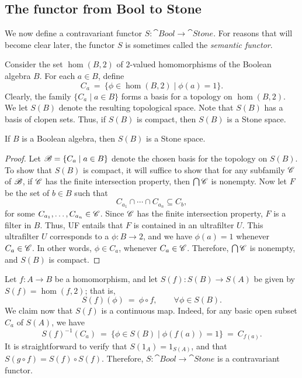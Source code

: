 \subsection*{The functor from Bool to Stone}

We now define a contravariant functor $S:\cat{Bool}\to\cat{Stone}$.
For reasons that will become clear later, the functor $S$ is sometimes
called the \emph{semantic functor}.

Consider the set $\hom (B,2)$ of $2$-valued homomorphisms of the
Boolean algebra $B$.  For each $a\in B$, define
\[ C_a \: = \: \{ \phi \in \hom (B,2) \mid \phi (a)=1 \} .\] Clearly,
the family $\{ C_a\mid a\in B\}$ forms a basis for a topology on $\hom
(B,2)$.  We let $S(B)$ denote the resulting topological space.  Note
that $S(B)$ has a basis of clopen sets.  Thus, if $S(B)$ is compact,
then $S(B)$ is a Stone space.

\begin{lemma} If $B$ is a Boolean algebra, then $S(B)$ is a Stone
  space. \end{lemma}

\begin{proof} Let $\mathscr B = \{ C_a\mid a\in B\}$ denote the chosen basis
  for the topology on $S(B)$.  To show that $S(B)$ is compact, it will
  suffice to show that for any subfamily $\mathscr C$ of $\mathscr B$, if $\mathscr C$ has
  the finite intersection property, then $\bigcap \mathscr C$ is nonempty.
  Now let $F$ be the set of $b\in B$ such that
  \[ C_{a_1}\cap \cdots \cap C_{a_n}\subseteq C_b ,\] for some
  $C_{a_1},\dots ,C_{a_n}\in \mathscr C$.  Since $\mathscr C$ has the finite
  intersection property, $F$ is a filter in $B$.  Thus, UF entails
  that $F$ is contained in an ultrafilter $U$.  This ultrafilter $U$
  corresponds to a $\phi :B\to 2$, and we have $\phi (a)=1$ whenever
  $C_a\in \mathscr C$.  In other words, $\phi \in C_a$, whenever $C_a\in
  \mathscr C$.  Therefore, $\bigcap \mathscr C$ is nonempty, and $S(B)$ is compact.
\end{proof}

Let $f:A\to B$ be a homomorphism, and let $S(f):S(B)\to S(A)$ be given
by $S(f)=\hom (f,2)$; that is,
\[ S(f)(\phi ) \: = \: \phi \circ f ,\qquad \forall \phi \in S(B) .\]
We claim now that $S(f)$ is a continuous map.  Indeed, for any basic
open subset $C_a$ of $S(A)$, we have
\begin{equation} S(f)^{-1}(C_a) \: = \: \{ \phi \in S(B) \mid \phi
  (f(a)) = 1 \} \: = \: C_{f(a)} .\label{slick} \end{equation} It is
straightforward to verify that $S(1_A)=1_{S(A)}$, and that $S(g\circ
f)=S(f)\circ S(f)$.  Therefore, $S:\cat{Bool}\to\cat{Stone}$ is a
contravariant functor.



